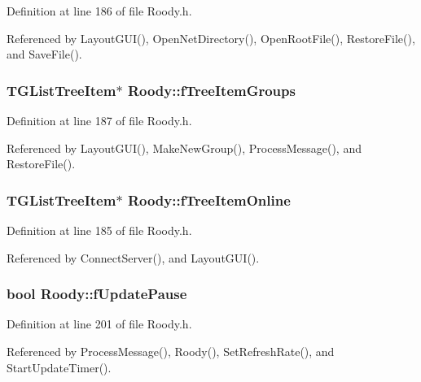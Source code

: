 Definition at line 186 of file Roody.h.



Referenced by LayoutGUI(), OpenNetDirectory(), OpenRootFile(), RestoreFile(), and SaveFile().

\subsubsection[{fTreeItemGroups}]{\setlength{\rightskip}{0pt plus 5cm}TGListTreeItem$\ast$ {\bf Roody::fTreeItemGroups}\hspace{0.3cm}{\ttfamily  [protected]}}\label{classRoody_a992daab6fccc73ab000819a4486fe283}


Definition at line 187 of file Roody.h.



Referenced by LayoutGUI(), MakeNewGroup(), ProcessMessage(), and RestoreFile().

\subsubsection[{fTreeItemOnline}]{\setlength{\rightskip}{0pt plus 5cm}TGListTreeItem$\ast$ {\bf Roody::fTreeItemOnline}\hspace{0.3cm}{\ttfamily  [protected]}}\label{classRoody_ac608da81c5949e10666e37aea706cc5e}


Definition at line 185 of file Roody.h.



Referenced by ConnectServer(), and LayoutGUI().

\subsubsection[{fUpdatePause}]{\setlength{\rightskip}{0pt plus 5cm}bool {\bf Roody::fUpdatePause}\hspace{0.3cm}{\ttfamily  [private]}}\label{classRoody_a96fbcb2282d22a39069dd14c326185bb}


Definition at line 201 of file Roody.h.



Referenced by ProcessMessage(), Roody(), SetRefreshRate(), and StartUpdateTimer().

